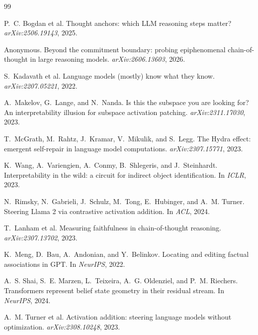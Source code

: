 \documentclass{article}
\begin{document}

\begin{thebibliography}{99}
\small

P.~C. Bogdan et al.
\newblock Thought anchors: which LLM reasoning steps matter?
\newblock \emph{arXiv:2506.19143}, 2025.

Anonymous.
\newblock Beyond the commitment boundary: probing epiphenomenal chain-of-thought in large
reasoning models.
\newblock \emph{arXiv:2606.13603}, 2026.

S.~Kadavath et al.
\newblock Language models (mostly) know what they know.
\newblock \emph{arXiv:2207.05221}, 2022.

A.~Makelov, G.~Lange, and N.~Nanda.
\newblock Is this the subspace you are looking for? An interpretability illusion for
subspace activation patching.
\newblock \emph{arXiv:2311.17030}, 2023.

T.~McGrath, M.~Rahtz, J.~Kramar, V.~Mikulik, and S.~Legg.
\newblock The Hydra effect: emergent self-repair in language model computations.
\newblock \emph{arXiv:2307.15771}, 2023.

K.~Wang, A.~Variengien, A.~Conmy, B.~Shlegeris, and J.~Steinhardt.
\newblock Interpretability in the wild: a circuit for indirect object identification.
\newblock In \emph{ICLR}, 2023.

N.~Rimsky, N.~Gabrieli, J.~Schulz, M.~Tong, E.~Hubinger, and A.~M. Turner.
\newblock Steering Llama 2 via contrastive activation addition.
\newblock In \emph{ACL}, 2024.

T.~Lanham et al.
\newblock Measuring faithfulness in chain-of-thought reasoning.
\newblock \emph{arXiv:2307.13702}, 2023.

K.~Meng, D.~Bau, A.~Andonian, and Y.~Belinkov.
\newblock Locating and editing factual associations in GPT.
\newblock In \emph{NeurIPS}, 2022.

A.~S. Shai, S.~E. Marzen, L.~Teixeira, A.~G. Oldenziel, and P.~M. Riechers.
\newblock Transformers represent belief state geometry in their residual stream.
\newblock In \emph{NeurIPS}, 2024.

A.~M. Turner et al.
\newblock Activation addition: steering language models without optimization.
\newblock \emph{arXiv:2308.10248}, 2023.


\end{thebibliography}
\end{document}
